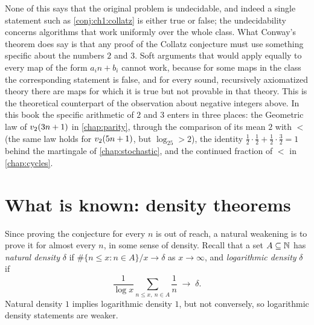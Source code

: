 None of this says that the original problem is undecidable, and indeed a
single statement such as \cref{conj:ch1:collatz} is either true or false; the
undecidability concerns algorithms that work uniformly over the whole class.
What Conway's theorem does say is that any proof of the Collatz conjecture
must use something specific about the numbers $2$ and $3$. Soft arguments
that would apply equally to every map of the form $a_i n+b_i$ cannot work,
because for some maps in the class the corresponding statement is false, and for every sound, recursively axiomatized theory there are maps for which it is true but not provable in that theory.
This is the
theoretical counterpart of the observation about negative integers above.
In this book the specific arithmetic of $2$ and $3$ enters in three places:
the Geometric law of $v_2(3n+1)$ in \cref{chap:parity}, through the comparison of its mean $2$ with $\lt$ (the same law holds for $v_2(5n+1)$, but $\log_25>2$), the identity
$\tfrac12\cdot\tfrac12+\tfrac12\cdot\tfrac32=1$ behind the martingale of
\cref{chap:stochastic}, and the continued fraction of $\lt$ in
\cref{chap:cycles}.

\section{What is known: density theorems}\label{sec:ch1:density}

Since proving the conjecture for every $n$ is out of reach, a natural weakening
is to prove it for almost every $n$, in some sense of density. Recall that a
set $A\subseteq\mathbb{N}$ has \emph{natural density} $\delta$ if
$\#\{n\leq x:n\in A\}/x\to\delta$ as $x\to\infty$, and \emph{logarithmic
density} $\delta$ if
\[
  \frac{1}{\log x}\sum_{n\leq x,\ n\in A}\frac1n\;\longrightarrow\;\delta .
\]
Natural density $1$ implies logarithmic density $1$, but not conversely, so
logarithmic density statements are weaker.


